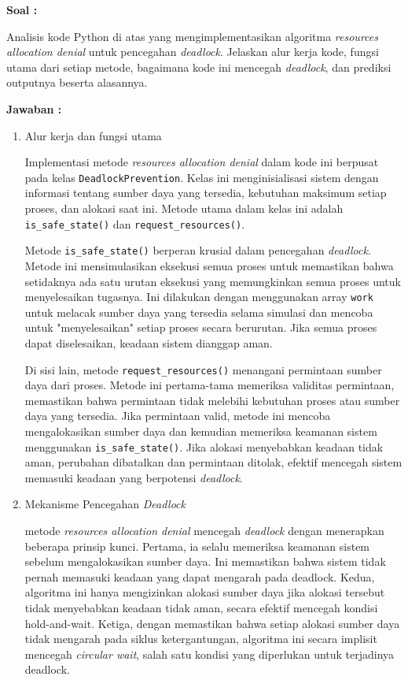\documentclass[12pt]{article}
\begin{document}
\textbf{Soal :}

\par Analisis kode Python di atas yang mengimplementasikan algoritma \textit{resources allocation denial} untuk
pencegahan \textit{deadlock}. Jelaskan alur kerja kode, fungsi utama dari setiap metode,
bagaimana kode ini mencegah \textit{deadlock}, dan prediksi outputnya beserta alasannya.

\textbf{Jawaban :}

\begin{enumerate}
    \item Alur kerja dan fungsi utama
    
Implementasi metode \textit{resources allocation denial} dalam kode ini berpusat pada kelas \texttt{DeadlockPrevention}. Kelas ini menginisialisasi sistem dengan informasi tentang sumber daya yang tersedia, kebutuhan maksimum setiap proses, dan alokasi saat ini. Metode utama dalam kelas ini adalah \texttt{is\_safe\_state()} dan \texttt{request\_resources()}.

Metode \texttt{is\_safe\_state()} berperan krusial dalam pencegahan \textit{deadlock}. Metode ini mensimulasikan eksekusi semua proses untuk memastikan bahwa setidaknya ada satu urutan eksekusi yang memungkinkan semua proses untuk menyelesaikan tugasnya. Ini dilakukan dengan menggunakan array \texttt{work} untuk melacak sumber daya yang tersedia selama simulasi dan mencoba untuk "menyelesaikan" setiap proses secara berurutan. Jika semua proses dapat diselesaikan, keadaan sistem dianggap aman.

Di sisi lain, metode \texttt{request\_resources()} menangani permintaan sumber daya dari proses. Metode ini pertama-tama memeriksa validitas permintaan, memastikan bahwa permintaan tidak melebihi kebutuhan proses atau sumber daya yang tersedia. Jika permintaan valid, metode ini mencoba mengalokasikan sumber daya dan kemudian memeriksa keamanan sistem menggunakan \texttt{is\_safe\_state()}. Jika alokasi menyebabkan keadaan tidak aman, perubahan dibatalkan dan permintaan ditolak, efektif mencegah sistem memasuki keadaan yang berpotensi \textit{deadlock}.

\item Mekanisme Pencegahan \textit{Deadlock}

metode \textit{resources allocation denial} mencegah \textit{deadlock} dengan menerapkan beberapa prinsip kunci. Pertama, ia selalu memeriksa keamanan sistem sebelum mengalokasikan sumber daya. Ini memastikan bahwa sistem tidak pernah memasuki keadaan yang dapat mengarah pada deadlock. Kedua, algoritma ini hanya mengizinkan alokasi sumber daya jika alokasi tersebut tidak menyebabkan keadaan tidak aman, secara efektif mencegah kondisi {hold-and-wait}. Ketiga, dengan memastikan bahwa setiap alokasi sumber daya tidak mengarah pada siklus ketergantungan, algoritma ini secara implisit mencegah \textit{circular wait}, salah satu kondisi yang diperlukan untuk terjadinya deadlock.


\end{enumerate}
\end{document}
